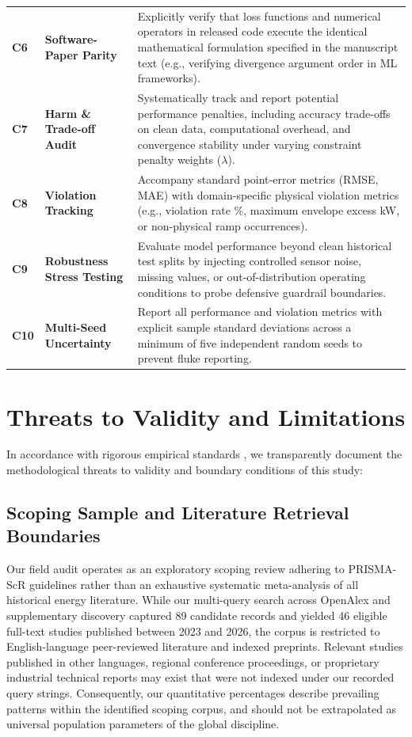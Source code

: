 \documentclass[preprint,3p,times]{elsarticle}
\begin{document}
\begin{table}[t]
\begin{tabular}{lp{3.5cm}p{10.5cm}}
\textbf{C6} & \textbf{Software-Paper Parity} & Explicitly verify that loss functions and numerical operators in released code execute the identical mathematical formulation specified in the manuscript text (e.g., verifying divergence argument order in ML frameworks). \\
\textbf{C7} & \textbf{Harm \& Trade-off Audit} & Systematically track and report potential performance penalties, including accuracy trade-offs on clean data, computational overhead, and convergence stability under varying constraint penalty weights ($\lambda$). \\
\textbf{C8} & \textbf{Violation Tracking} & Accompany standard point-error metrics (RMSE, MAE) with domain-specific physical violation metrics (e.g., violation rate \%, maximum envelope excess kW, or non-physical ramp occurrences). \\
\textbf{C9} & \textbf{Robustness Stress Testing} & Evaluate model performance beyond clean historical test splits by injecting controlled sensor noise, missing values, or out-of-distribution operating conditions to probe defensive guardrail boundaries. \\
\textbf{C10} & \textbf{Multi-Seed Uncertainty} & Report all performance and violation metrics with explicit sample standard deviations across a minimum of five independent random seeds to prevent fluke reporting. \\
\bottomrule
\end{tabular}
\end{table}

\section{Threats to Validity and Limitations}
\label{sec:limitations}

In accordance with rigorous empirical standards \cite{lipton2019,kapoor2023}, we transparently document the methodological threats to validity and boundary conditions of this study:

\subsection{Scoping Sample and Literature Retrieval Boundaries}
Our field audit operates as an exploratory scoping review adhering to PRISMA-ScR guidelines rather than an exhaustive systematic meta-analysis of all historical energy literature. While our multi-query search across OpenAlex and supplementary discovery captured 89 candidate records and yielded 46 eligible full-text studies published between 2023 and 2026, the corpus is restricted to English-language peer-reviewed literature and indexed preprints. Relevant studies published in other languages, regional conference proceedings, or proprietary industrial technical reports may exist that were not indexed under our recorded query strings. Consequently, our quantitative percentages describe prevailing patterns within the identified scoping corpus, and should not be extrapolated as universal population parameters of the global discipline.
\end{document}
